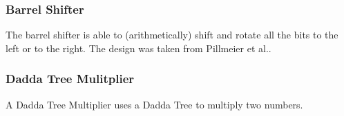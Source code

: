 \documentclass[twoside]{article}
\begin{document}
\subsubsection*{Barrel Shifter}
The barrel shifter is able to (arithmetically) shift and rotate all the bits
to the left or to the right. The design was taken from Pillmeier et
al.\cite{pillmeier02}.

\subsubsection*{Dadda Tree Mulitplier}
A Dadda Tree Multiplier uses a Dadda Tree to multiply two numbers.



\end{document}
